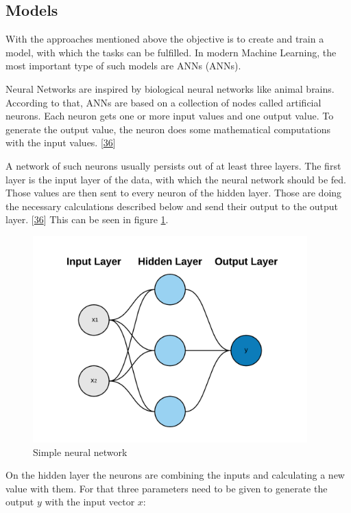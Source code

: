 \documentclass[12pt,english,a4paper,oneside,,tablecaptionabove]{scrbook}
\begin{document}
\hypertarget{sec:nnmodels}{%
\subsection{Models}\label{sec:nnmodels}}

With the approaches mentioned above the objective is to create and train
a model, with which the tasks can be fulfilled. In modern Machine
Learning, the most important type of such models are \acl{ANN}s
(\acs{ANN}s).

Neural Networks are inspired by biological neural networks like animal
brains. According to that, \acs{ANN}s are based on a collection of nodes
called artificial neurons. Each neuron gets one or more input values and
one output value. To generate the output value, the neuron does some
mathematical computations with the input values.
{[}\protect\hyperlink{ref-Stroetmann2018}{36}{]}

A network of such neurons usually persists out of at least three layers.
The first layer is the input layer of the data, with which the neural
network should be fed. Those values are then sent to every neuron of the
hidden layer. Those are doing the necessary calculations described below
and send their output to the output layer.
{[}\protect\hyperlink{ref-Stroetmann2018}{36}{]} This can be seen in
figure \ref{fig:neural_net}.

\begin{figure}
\hypertarget{fig:neural_net}{%
\centering
\includegraphics[width=4.16667in,height=\textheight]{images/chapter2/neural_net.png}
\caption{Simple neural network}\label{fig:neural_net}
}
\end{figure}

On the hidden layer the neurons are combining the inputs and calculating
a new value with them. For that three parameters need to be given to
generate the output \(y\) with the input vector \(x\):
\end{document}
